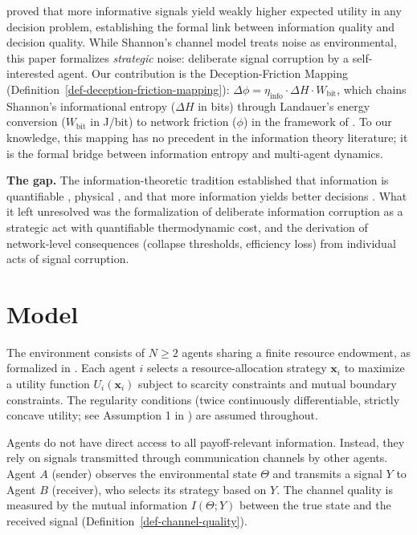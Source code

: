 \documentclass[11pt]{article}
\theoremstyle{plain}
\theoremstyle{definition}
\theoremstyle{remark}
\let\origsection\section
\renewcommand{\section}{\needspace{12\baselineskip}\origsection}
\begin{document}
\citet{Blackwell1953} proved that more informative signals yield weakly
higher expected utility in any decision problem, establishing the formal
link between information quality and decision quality. While Shannon's
channel model treats noise as environmental, this paper formalizes
\emph{strategic} noise: deliberate signal corruption by a
self-interested agent. Our contribution is the Deception-Friction
Mapping (Definition~\ref{def-deception-friction-mapping}):
\(\Delta\phi = \eta_{\text{info}} \cdot \Delta H \cdot W_{\text{bit}}\),
which chains Shannon's informational entropy (\(\Delta H\) in bits)
through Landauer's energy conversion (\(W_{\text{bit}}\) in J/bit) to
network friction (\(\phi\)) in the framework of \citep{TC-IV}. To our
knowledge, this mapping has no precedent in the information theory
literature; it is the formal bridge between information entropy and
multi-agent dynamics.

\textbf{The gap.} The information-theoretic tradition established that
information is quantifiable \citep{Shannon1948}, physical
\citep{Brillouin1962, Landauer1961}, and that more information yields
better decisions \citep{Blackwell1953}. What it left unresolved was the
formalization of deliberate information corruption as a strategic act
with quantifiable thermodynamic cost, and the derivation of
network-level consequences (collapse thresholds, efficiency loss) from
individual acts of signal corruption.

\section{Model}\label{model}

The environment consists of \(N \geq 2\) agents sharing a finite
resource endowment, as formalized in \citep{TC-I}. Each agent \(i\)
selects a resource-allocation strategy \(\mathbf{x}_i\) to maximize a
utility function \(U_i(\mathbf{x}_i)\) subject to scarcity constraints
and mutual boundary constraints. The regularity conditions (twice
continuously differentiable, strictly concave utility; see Assumption 1
in \citep{TC-I}) are assumed throughout.

Agents do not have direct access to all payoff-relevant information.
Instead, they rely on signals transmitted through communication channels
by other agents. Agent \(A\) (sender) observes the environmental state
\(\Theta\) and transmits a signal \(Y\) to Agent \(B\) (receiver), who
selects its strategy based on \(Y\). The channel quality is measured by
the mutual information \(I(\Theta; Y)\) between the true state and the
received signal (Definition~\ref{def-channel-quality}).
\end{document}

